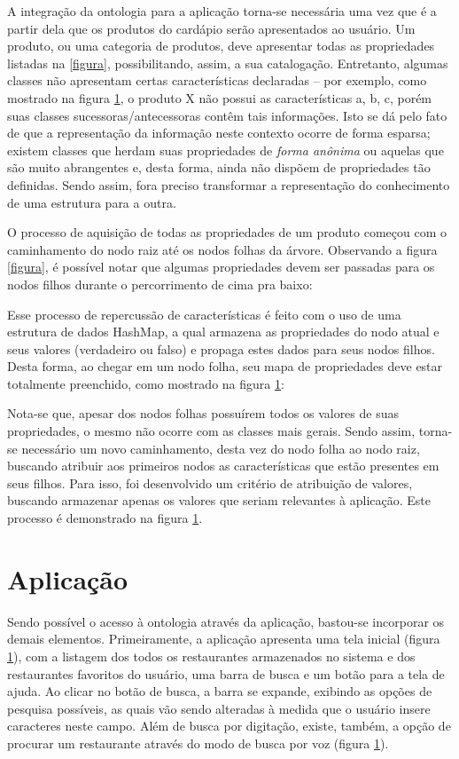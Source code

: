 A integração da ontologia para a aplicação torna-se necessária uma vez que é a partir dela que os produtos do cardápio serão apresentados ao usuário. Um produto, ou uma categoria de produtos, deve apresentar todas as propriedades listadas na \ref{figura}, possibilitando, assim, a sua catalogação. Entretanto, algumas classes não apresentam certas características declaradas -- por exemplo, como mostrado na figura \ref{}, o produto X não possui as características a, b, c, porém suas classes sucessoras/antecessoras contêm tais informações. Isto se dá pelo fato de que a representação da informação neste contexto ocorre de forma esparsa; existem classes que herdam suas propriedades de \emph{forma anônima} ou aquelas que são muito abrangentes e, desta forma, ainda não dispõem de propriedades tão definidas. Sendo assim, fora preciso transformar a representação do conhecimento de uma estrutura para a outra.

O processo de aquisição de todas as propriedades de um produto começou com o caminhamento do nodo raiz até os nodos folhas da árvore. Observando a figura \ref{figura}, é possível notar que algumas propriedades devem ser passadas para os nodos filhos durante o percorrimento de cima pra baixo:

Esse processo de repercussão de características é feito com o uso de uma estrutura de dados HashMap, a qual armazena as propriedades do nodo atual e seus valores (verdadeiro ou falso) e propaga estes dados para seus nodos filhos. Desta forma, ao chegar em um nodo folha, seu mapa de propriedades deve estar totalmente preenchido, como mostrado na figura \ref{}:

Nota-se que, apesar dos nodos folhas possuírem todos os valores de suas propriedades, o mesmo não ocorre com as classes mais gerais. Sendo assim, torna-se necessário um novo caminhamento, desta vez do nodo folha ao nodo raiz, buscando atribuir aos primeiros nodos as características que estão presentes em seus filhos. Para isso, foi desenvolvido um critério de atribuição de valores, buscando armazenar apenas os valores que seriam relevantes à aplicação. Este processo é demonstrado na figura \ref{}. 

\section{Aplicação}

Sendo possível o acesso à ontologia através da aplicação, bastou-se incorporar os demais elementos. Primeiramente, a aplicação apresenta uma tela inicial (figura \ref{}), com a listagem dos todos os restaurantes armazenados no sistema e dos restaurantes favoritos do usuário, uma barra de busca e um botão para a tela de ajuda. Ao clicar no botão de busca, a barra se expande, exibindo as opções de pesquisa possíveis, as quais vão sendo alteradas à medida que o usuário insere caracteres neste campo. Além de busca por digitação, existe, também, a opção de procurar um restaurante através do modo de busca por voz (figura \ref{}).


